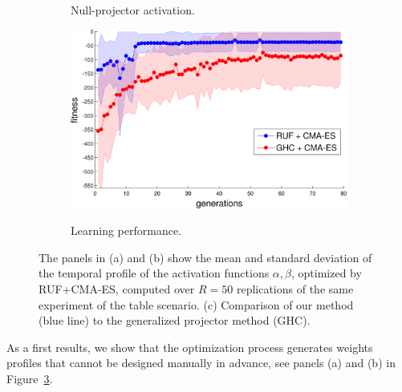 \documentclass[final,5p,twocolumn]{elsarticle}
\begin{document}
\begin{figure}
\begin{subfigure}{.3\linewidth}
  \label{fig:alpha2}
  \caption{Null-projector activation.}
\end{subfigure}
\begin{subfigure}{.3\linewidth}
  \centering
  \includegraphics[width=\linewidth]{./sections/WP4/pics_serena/comparison}
  \label{fig:alpha3}
  \caption{Learning performance.}
\end{subfigure}
\caption{The panels in (a) and (b) show the mean and standard deviation of the temporal
profile of the activation functions $\alpha,\beta$, optimized by RUF+CMA-ES,
computed over $R=50$ replications of the same experiment of the table scenario.
(c) Comparison of our method (blue line) to the generalized projector method (GHC).}
\label{fig:activation_policy}
\end{figure}

As a first results, we show that the optimization process  generates weights
profiles that cannot be designed manually in advance, see panels (a) and (b) in 
Figure~\ref{fig:activation_policy}.

\end{document}
